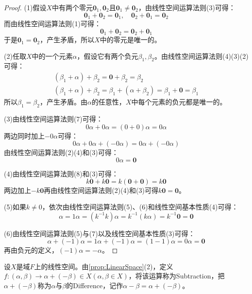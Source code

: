 \begin{proof}
	(1)假设$X$中有两个零元$\mathbf{0}_1,\mathbf{0}_2$且$\mathbf{0}_1\ne\mathbf{0}_2$，由线性空间运算法则(3)可得：
	\begin{equation*}
		\mathbf{0}_1+\mathbf{0}_2=\mathbf{0}_1,\quad\mathbf{0}_2+\mathbf{0}_1=\mathbf{0}_2
	\end{equation*}
	而由线性空间运算法则(1)可得：
	\begin{equation*}
		\mathbf{0}_1+\mathbf{0}_2=\mathbf{0}_2+\mathbf{0}_1
	\end{equation*}
	于是$\mathbf{0}_1=\mathbf{0}_2$，产生矛盾，所以$X$中的零元是唯一的。\par
	(2)任取$X$中的一个元素$\alpha$，假设它有两个负元$\beta_1,\beta_2$。由线性空间运算法则(4)(3)(2)可得：
	\begin{gather*}
		(\beta_1+\alpha)+\beta_2=\mathbf{0}+\beta_2=\beta_2 \\
		(\beta_1+\alpha)+\beta_2=\beta_1+(\alpha+\beta_2)=\beta_1+\mathbf{0}=\beta_1
	\end{gather*}
	所以$\beta_1=\beta_2$，产生矛盾。由$\alpha$的任意性，$X$中每个元素的负元都是唯一的。\par
	(3)由线性空间运算法则(7)可得：
	\begin{equation*}
		0\alpha+0\alpha=(0+0)\alpha=0\alpha
	\end{equation*}
	两边同时加上$-0\alpha$可得：
	\begin{equation*}
		0\alpha+0\alpha+(-0\alpha)=0\alpha+(-0\alpha)
	\end{equation*}
	由线性空间运算法则(2)(4)和(3)可得：
	\begin{equation*}
		0\alpha=\mathbf{0}
	\end{equation*}\par
	(4)由线性空间运算法则(8)和(3)可得：
	\begin{equation*}
		k\mathbf{0}+k\mathbf{0}=k(\mathbf{0}+\mathbf{0})=k\mathbf{0}
	\end{equation*}
	两边加上$-k\mathbf{0}$再由线性空间运算法则(2)(4)和(3)可得$k\mathbf{0}=\mathbf{0}$。\par
	(5)如果$k\ne0$，依次由线性空间运算法则(5)、(6)和线性空间基本性质(4)可得：
	\begin{equation*}
		\alpha=1\alpha=(k^{-1}k)\alpha=k^{-1}(k\alpha)=k^{-1}\mathbf{0}=\mathbf{0}
	\end{equation*}\par
	(6)由线性空间运算法则(5)与(7)以及线性空间基本性质(3)可得：
	\begin{equation*}
		\alpha+(-1)\alpha=1\alpha+(-1)\alpha=(1-1)\alpha=0\alpha=\mathbf{0}
	\end{equation*}
	再由负元的定义，$(-1)\alpha=-\alpha$。
\end{proof}
\begin{definition}
	设$X$是域$F$上的线性空间。由\cref{prop:LinearSpace}(2)，定义$f:(\alpha,\beta)\rightarrow\alpha+(-\beta)\in X(\alpha,\beta\in X)$，将该运算称为\gls{Subtraction}，把$\alpha+(-\beta)$称为$\alpha$与$\beta$的\gls{Difference}，记作$\alpha-\beta=\alpha+(-\beta)$。
\end{definition}

